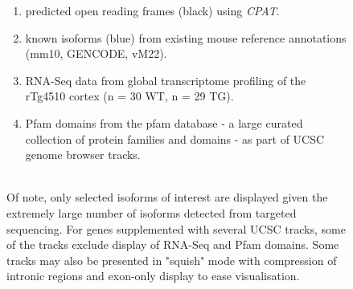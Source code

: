 \begin{figure}[htp]
{\begin{enumerate}[label=\textbf{(\Alph*)}]
		\item predicted open reading frames (black) using \textit{CPAT}.  
		\item known isoforms (blue) from existing mouse reference annotations (mm10, GENCODE, vM22).
		\item RNA-Seq data from global transcriptome profiling of the rTg4510 cortex\cite{Castanho2020} (n = 30 WT, n = 29 TG).
		\item Pfam domains from the pfam database - a large curated collection of protein families and domains - as part of UCSC genome browser tracks.	
		\\ \\	
	\end{enumerate} 

	Of note, only selected isoforms of interest are displayed given the extremely large number of isoforms detected from targeted sequencing. For genes supplemented with several UCSC tracks, some of the tracks exclude display of RNA-Seq and Pfam domains. Some tracks may also be presented in "squish" mode with compression of intronic regions and exon-only display to ease visualisation. 
	}   
	\label{fig:eg_track}
\end{figure}

